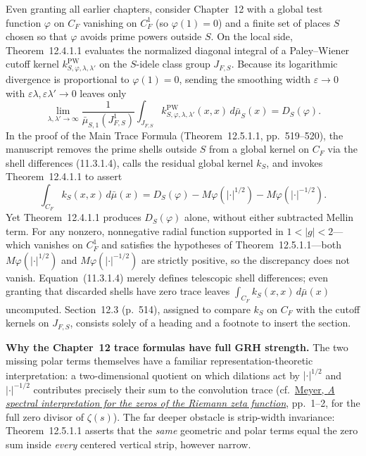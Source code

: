 \documentclass[11pt,letterpaper]{article}
\newcommand{\dd}{\,d}
\begin{document}
Even granting all earlier chapters, consider Chapter~12 with a global test function $\varphi$ on $C_F$ vanishing on $C_F^1$ (so $\varphi(1)=0$) and a finite set of places $S$ chosen so that $\varphi$ avoids prime powers outside $S$. On the local side, Theorem~12.4.1.1 evaluates the normalized diagonal integral of a Paley--Wiener cutoff kernel $k^{\mathrm{PW}}_{S,\varphi,\lambda,\lambda'}$ on the $S$-idele class group $J_{F,S}$. Because its logarithmic divergence is proportional to $\varphi(1)=0$, sending the smoothing width $\varepsilon\to 0$ with $\varepsilon\lambda,\varepsilon\lambda'\to 0$ leaves only
\[
  \lim_{\lambda,\lambda'\to\infty}
  \frac{1}{\bar\mu_{S,1}(J_{F,S}^1)}
  \int_{J_{F,S}} k^{\mathrm{PW}}_{S,\varphi,\lambda,\lambda'}(x,x)\dd\bar\mu_S(x)
  = D_S(\varphi).
\]
In the proof of the Main Trace Formula (Theorem~12.5.1.1, pp.~519--520), the manuscript removes the prime shells outside $S$ from a global kernel on $C_F$ via the shell differences (11.3.1.4), calls the residual global kernel $k_S$, and invokes Theorem~12.4.1.1 to assert
\[
  \int_{C_F} k_S(x,x)\dd\bar\mu(x)
  = D_S(\varphi) - M\varphi(|\cdot|^{1/2}) - M\varphi(|\cdot|^{-1/2}).
\]
Yet Theorem~12.4.1.1 produces $D_S(\varphi)$ alone, without either subtracted Mellin term. For any nonzero, nonnegative radial function supported in $1 < |g| < 2$---which vanishes on $C_F^1$ and satisfies the hypotheses of Theorem~12.5.1.1---both $M\varphi(|\cdot|^{1/2})$ and $M\varphi(|\cdot|^{-1/2})$ are strictly positive, so the discrepancy does not vanish. Equation~(11.3.1.4) merely defines telescopic shell differences; even granting that discarded shells have zero trace leaves $\int_{C_F} k_S(x,x)\dd\bar\mu(x)$ uncomputed. Section~12.3 (p.~514), assigned to compare $k_S$ on $C_F$ with the cutoff kernels on $J_{F,S}$, consists solely of a heading and a footnote to insert the section.

\textbf{Why the Chapter~12 trace formulas have full GRH strength.} The two missing polar terms themselves have a familiar representation-theoretic interpretation: a two-dimensional quotient on which dilations act by $|\cdot|^{1/2}$ and $|\cdot|^{-1/2}$ contributes precisely their sum to the convolution trace (cf.\ \href{https://arxiv.org/pdf/math/0412277}{Meyer, \emph{A spectral interpretation for the zeros of the Riemann zeta function}}, pp.~1--2, for the full zero divisor of $\zeta(s)$). The far deeper obstacle is strip-width invariance: Theorem~12.5.1.1 asserts that the \emph{same} geometric and polar terms equal the zero sum inside \emph{every} centered vertical strip, however narrow.
\end{document}

